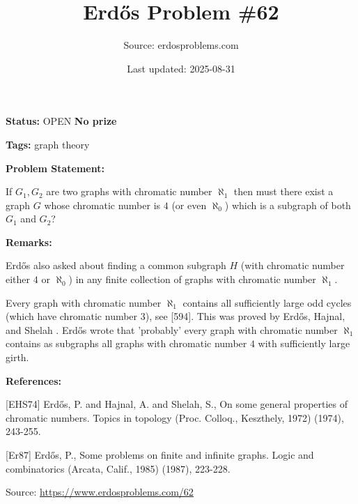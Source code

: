 \documentclass{article}
\title{Erd\H{o}s Problem \#62}
\date{Last updated: 2025-08-31}
\author{Source: erdosproblems.com}
\begin{document}
\maketitle

\noindent\textbf{Status:} OPEN \quad \textbf{No prize}

\noindent\textbf{Tags:} graph theory

\medskip
\noindent\textbf{Problem Statement:}

If $G_1,G_2$ are two graphs with chromatic number $\aleph_1$ then must there exist a graph $G$ whose chromatic number is $4$ (or even $\aleph_0$) which is a subgraph of both $G_1$ and $G_2$?

\bigskip
\noindent\textbf{Remarks:}

Erd\H{o}s also asked \cite{Er87} about finding a common subgraph $H$ (with chromatic number either $4$ or $\aleph_0$) in any finite collection of graphs with chromatic number $\aleph_1$. 

Every graph with chromatic number $\aleph_1$ contains all sufficiently large odd cycles (which have chromatic number $3$), see [594]. This was proved by Erd\H{o}s, Hajnal, and Shelah \cite{EHS74}. Erd\H{o}s wrote \cite{Er87} that 'probably' every graph with chromatic number $\aleph_1$ contains as subgraphs all graphs with chromatic number $4$ with sufficiently large girth.

\bigskip
\noindent\textbf{References:}

[EHS74] Erd\H{o}s, P. and Hajnal, A. and Shelah, S., On some general properties of chromatic numbers. Topics in topology (Proc. Colloq., Keszthely, 1972) (1974), 243-255.
 
 [Er87] Erd\H{o}s, P., Some problems on finite and infinite graphs. Logic and combinatorics (Arcata, Calif., 1985) (1987), 223-228.

\bigskip
\noindent\small{Source: \url{https://www.erdosproblems.com/62}}
\end{document}
